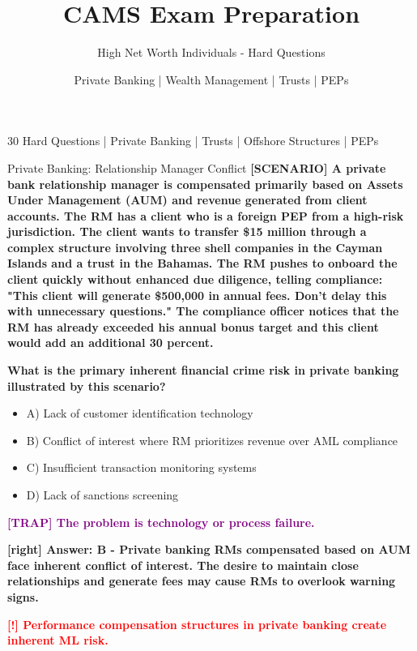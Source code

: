 \documentclass[11pt,a4paper]{beamer}
\title[CAMS Exam Preparation]{CAMS Exam Preparation}
\subtitle{High Net Worth Individuals - Hard Questions}
\author{Private Banking | Wealth Management | Trusts | PEPs}
\date{}
\newcommand{\redflag}[1]{\textcolor{red}{\textbf{[!] #1}}}
\newcommand{\trap}[1]{\textcolor{purple}{\textbf{[TRAP] #1}}}
\newcommand{\correct}[1]{\textcolor{green!50!black}{\textbf{[right] #1}}}
\newcommand{\scenario}[1]{\textcolor{blue!70!black}{\textbf{[SCENARIO] #1}}}
\begin{document}
	
	\begin{frame}
		\titlepage
		\centering
		\tiny 30 Hard Questions | Private Banking | Trusts | Offshore Structures | PEPs
	\end{frame}
	
	
	\begin{frame}{Private Banking: Relationship Manager Conflict}
		\tiny
		\scenario{A private bank relationship manager is compensated primarily based on Assets Under Management (AUM) and revenue generated from client accounts. The RM has a client who is a foreign PEP from a high-risk jurisdiction. The client wants to transfer \$15 million through a complex structure involving three shell companies in the Cayman Islands and a trust in the Bahamas. The RM pushes to onboard the client quickly without enhanced due diligence, telling compliance: "This client will generate \$500,000 in annual fees. Don't delay this with unnecessary questions." The compliance officer notices that the RM has already exceeded his annual bonus target and this client would add an additional 30 percent.}
		
		\vspace{0.02cm}
		\textbf{What is the primary inherent financial crime risk in private banking illustrated by this scenario?}
		\vspace{0.02cm}
		
		\begin{itemize}
			\item A) Lack of customer identification technology
			\item B) Conflict of interest where RM prioritizes revenue over AML compliance
			\item C) Insufficient transaction monitoring systems
			\item D) Lack of sanctions screening
		\end{itemize}
		
		\vspace{0.02cm}
		\trap{The problem is technology or process failure.}
		
		\vspace{0.02cm}
		\correct{Answer: B - Private banking RMs compensated based on AUM face inherent conflict of interest. The desire to maintain close relationships and generate fees may cause RMs to overlook warning signs.}
		
		\vspace{0.02cm}
		\redflag{Performance compensation structures in private banking create inherent ML risk.}
	\end{frame}
	
\end{document}
